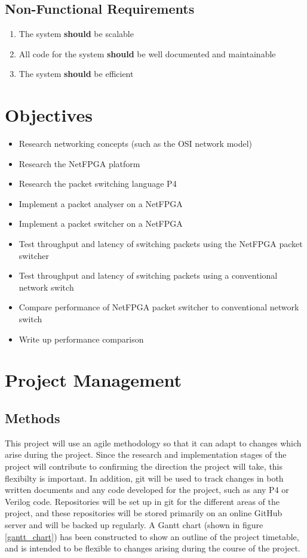 \documentclass[12pt, a4paper, twoside, onecolumn]{article}
\begin{document}
\subsection{Non-Functional Requirements}
\label{non_functional_requirements}
\begin{enumerate}[label=\textbf{NF\arabic*:}]
  \item The system \textbf{should} be scalable
  \item All code for the system \textbf{should} be well documented and maintainable
  \item The system \textbf{should} be efficient
\end{enumerate}

\section{Objectives}
\label{objectives}

\begin{itemize}
  \item Research networking concepts (such as the OSI network model)
  \item Research the NetFPGA platform \cite{NetFPGA}
  \item Research the packet switching language P4 \cite{P4}
  \item Implement a packet analyser on a NetFPGA
  \item Implement a packet switcher on a NetFPGA
  \item Test throughput and latency of switching packets using the NetFPGA packet switcher
  \item Test throughput and latency of switching packets using a conventional network switch
  \item Compare performance of NetFPGA packet switcher to conventional network switch
  \item Write up performance comparison
\end{itemize}

\section{Project Management}
\label{project_management}

\subsection{Methods}
\label{methods}
This project will use an agile methodology so that it can adapt to changes which arise during the project. Since the research and implementation stages of the project will contribute to confirming the direction the project will take, this flexibilty is important. In addition, git \cite{git} will be used to track changes in both written documents and any code developed for the project, such as any P4 or Verilog code. Repositories will be set up in git for the different areas of the project, and these repositories will be stored primarily on an online GitHub \cite{github} server and will be backed up regularly. A Gantt chart (shown in figure \ref{gantt_chart}) has been constructed to show an outline of the project timetable, and is intended to be flexible to changes arising during the course of the project.
\end{document}
